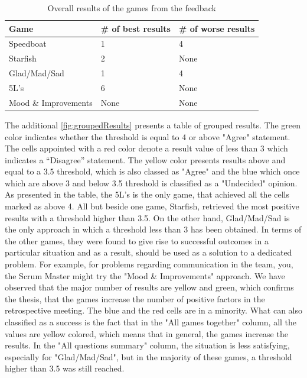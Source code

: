 \begin{table}[!htbp]
	\caption{Overall results of the games from the feedback}
	\label{tab:groups-overallConclusion}
	\begin{tabularx}{\textwidth}{|X|X|X|}
	\hline
		Game & \# of best results & \# of worse results\\ \hline
		Speedboat & 1 & 4 \\ \hline
		Starfish & 2 & None \\ \hline
        Glad/Mad/Sad & 1 & 4 \\ \hline
        5L's & 6 & None \\ \hline
        Mood \& Improvements & None & None\\ \hline
	\end{tabularx}
\end{table}

The additional \autoref{fig:groupedResults} presents a table of grouped results. The green color indicates whether the threshold is equal to 4 or above "Agree" statement. The cells appointed with a red color denote a result value of less than 3 which indicates a “Disagree” statement. The yellow color presents results above and equal to a 3.5 threshold, which is also classed as "Agree" and the blue which once which are above 3 and below 3.5 threshold is classified as a "Undecided" opinion. As presented in the table, the 5L’s is the only game, that achieved all the cells marked as above 4. All but beside one game, Starfish, retrieved the most positive results with a threshold higher than 3.5. On the other hand, Glad/Mad/Sad is the only approach in which a threshold less than 3 has been obtained. In terms of the other games, they were found to give rise to successful outcomes in a particular situation and as a result, should be used as a solution to a dedicated problem. For example, for problems regarding communication in the team, you, the Scrum Master might try the "Mood \& Improvements" approach. We have observed that the major number of results are yellow and green, which confirms the thesis, that the games increase the number of positive factors in the retrospective meeting. The blue and the red cells are in a minority. What can also classified as a success is the fact that in the "All games together" column, all the values are yellow colored, which means that in general, the games increase the results. In the "All questions summary" column, the situation is less satisfying, especially for "Glad/Mad/Sad", but in the majority of these games, a threshold higher than 3.5 was still reached.


